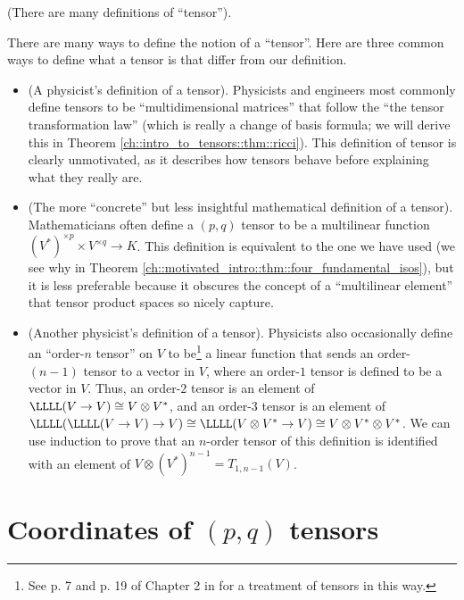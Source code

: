 \begin{remark}
\label{ch::motivated_intro::rmk::many_defs_tensor}
    (There are many definitions of ``tensor'').
    
    There are many ways to define the notion of a ``tensor''. Here are three common ways to define what a tensor is that differ from our definition.
    
    \begin{itemize}
        \item (A physicist's definition of a tensor). Physicists and engineers most commonly define tensors to be ``multidimensional matrices'' that follow the ``the tensor transformation law'' (which is really a change of basis formula; we will derive this in Theorem \ref{ch::intro_to_tensors::thm::ricci}). This definition of tensor is clearly unmotivated, as it describes how tensors behave before explaining what they really are.
        \item (The more ``concrete'' but less insightful mathematical definition of a tensor). Mathematicians often define a $(p, q)$ tensor to be a multilinear function $(V^*)^{\times p} \times V^{\times q} \rightarrow K$. This definition is equivalent to the one we have used (we see why in Theorem \ref{ch::motivated_intro::thm::four_fundamental_isos}), but it is less preferable because it obscures the concept of a ``multilinear element'' that tensor product spaces so nicely capture.
        \item (Another physicist's definition of a tensor). Physicists also occasionally define an ``order-$n$ tensor'' on $V$ to be\footnote{See p. 7 and p. 19 of Chapter 2 in \cite{BonetWood} for a treatment of tensors in this way.} a linear function that sends an order-$(n - 1)$ tensor to a vector in $V$, where an order-$1$ tensor is defined to be a vector in $V$. Thus, an order-$2$ tensor is an element of $\LLLL(V \rightarrow V) \cong V \otimes V^*$, and an order-$3$ tensor is an element of $\LLLL(\LLLL(V \rightarrow V) \rightarrow V) \cong \LLLL(V \otimes V^* \rightarrow V) \cong V \otimes V^* \otimes V^*$. We can use induction to prove that an $n$-order tensor of this definition is identified with an element of $V \otimes (V^{*})^{n - 1} = T_{1, n - 1}(V)$.
    \end{itemize}
\end{remark}

\newpage

\section{Coordinates of $(p, q)$ tensors}

